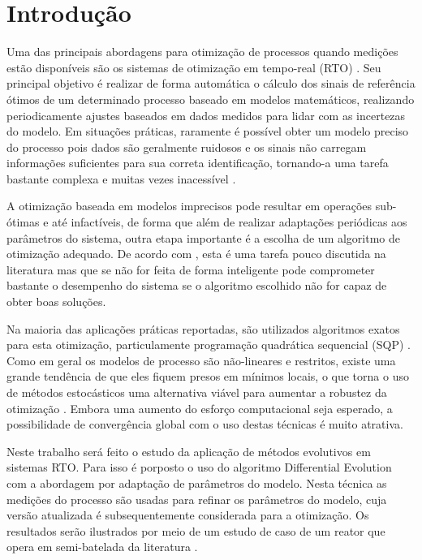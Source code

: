 \documentclass[conference]{IEEEtran}
\begin{document}
\section{Introdução}
Uma das principais abordagens para otimização de processos quando medições estão disponíveis são os sistemas de otimização em tempo-real (RTO) \cite{darby2011rto}. Seu principal objetivo é realizar de forma automática o cálculo dos sinais de referência ótimos de um determinado processo baseado em modelos matemáticos, realizando periodicamente ajustes baseados em dados medidos para lidar com as incertezas do modelo. 
Em situações práticas, raramente é possível obter um modelo preciso do processo pois dados são geralmente ruidosos e os sinais não carregam informações suficientes para sua correta identificação, tornando-a uma tarefa bastante complexa e muitas vezes inacessível \cite{chachuat2009adaptation}. 

A otimização baseada em modelos imprecisos pode resultar em operações sub-ótimas e até infactíveis, de forma que além de realizar adaptações periódicas aos parâmetros do sistema, outra etapa importante é a escolha de um algoritmo de otimização adequado. De acordo com \cite{quelhas2013common}, esta é uma tarefa pouco discutida na literatura mas que se não for feita de forma inteligente pode comprometer bastante o desempenho do sistema se o algoritmo escolhido não for capaz de obter boas soluções. 

Na maioria das aplicações práticas reportadas, são utilizados algoritmos exatos para esta otimização, particulamente programação quadrática sequencial (SQP) \cite{quelhas2013common}. Como em geral os modelos de processo são não-lineares e restritos, existe uma grande tendência de que eles fiquem presos em mínimos locais, o que torna o uso de métodos estocásticos uma alternativa viável para aumentar a robustez da otimização \cite{quelhas2013common}. Embora uma aumento do esforço computacional seja esperado, a possibilidade de convergência global com o uso destas técnicas é muito atrativa. 

Neste trabalho será feito o estudo da aplicação de métodos evolutivos em sistemas RTO. Para isso é porposto o uso do algoritmo Differential Evolution \cite{pant2020differential} com a abordagem por adaptação de parâmetros do modelo. Nesta técnica as medições do processo são usadas para refinar os parâmetros do modelo, cuja versão atualizada é subsequentemente considerada para a otimização. Os resultados serão ilustrados por meio de um estudo de caso de um reator que opera em semi-batelada da literatura \cite{chachuat2009adaptation}.
\end{document}

